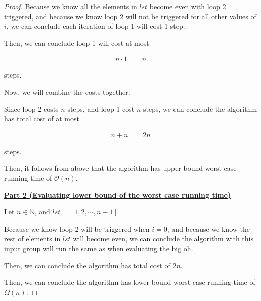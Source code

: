 \documentclass[12pt]{article}
\begin{document}
\begin{enumerate}[a.]
\begin{proof}
        \bigskip

        Because we know all the elements in $lst$ become even with loop 2 triggered,
        and because we know loop 2 will not be triggered for all other values of $i$,
        we can conclude each iteration of loop 1 will cost 1 step.

        \bigskip

        Then, we can conclude loop 1 will cost at most

        \begin{align}
            n \cdot 1 &= n
        \end{align}

        steps.

        \bigskip

        Now, we will combine the costs together.

        \bigskip

        Since loop 2 costs $n$ steps, and loop 1 cost $n$ steps, we can conclude
        the algorithm has total cost of at most

        \begin{align}
            n + n &= 2n
        \end{align}

        steps.

        \bigskip

        Then, it follows from above that the algorithm has upper bound worst-case
        running time of $\mathcal{O}(n)$.

        \bigskip

        \underline{\textbf{Part 2 (Evaluating lower bound of the worst case running time)}}

        \bigskip

        Let $n \in \mathbb{N}$, and $lst = [1,2,\cdots,n-1]$

        \bigskip

        Because we know loop 2 will be triggered when $i = 0$, and because we know
        the rest of elements in $lst$ will become even, we can conclude
        the algorithm with this input group will run the same as when evaluating the big oh.

        \bigskip

        Then, we can conclude the algorithm has total cost of $2n$.

        \bigskip

        Then, we can conclude the algorithm has lower bound worst-case running
        time of $\Omega(n)$.


\end{proof}
\end{enumerate}
\end{document}
